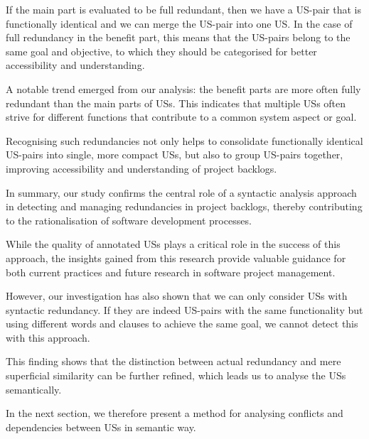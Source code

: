  If the main part is evaluated to be full redundant, then we have a US-pair that is functionally identical and we can merge the US-pair into one US. In the case of full redundancy in the benefit part, this means that the US-pairs belong to the same goal and objective, to which they should be categorised for better accessibility and understanding.
 
A notable trend emerged from our analysis: the benefit parts are more often fully redundant than the main parts of USs. This indicates that multiple USs often strive for different functions that contribute to a common system aspect or goal.

Recognising such redundancies not only helps to consolidate functionally identical US-pairs into single, more compact USs, but also to group US-pairs together, improving accessibility and understanding of project backlogs.

In summary, our study confirms the central role of a syntactic analysis approach in detecting and managing redundancies in project backlogs, thereby contributing to the rationalisation of software development processes.

While the quality of annotated USs plays a critical role in the success of this approach, the insights gained from this research provide valuable guidance for both current practices and future research in software project management.

However, our investigation has also shown that we can only consider USs with syntactic redundancy. If they are indeed US-pairs with the same functionality but using different words and clauses to achieve the same goal, we cannot detect this with this approach.

This finding shows that the distinction between actual redundancy and mere superficial similarity can be further refined, which leads us to analyse the USs semantically.

In the next section, we therefore present a method for analysing conflicts and dependencies between USs in semantic way.

%
